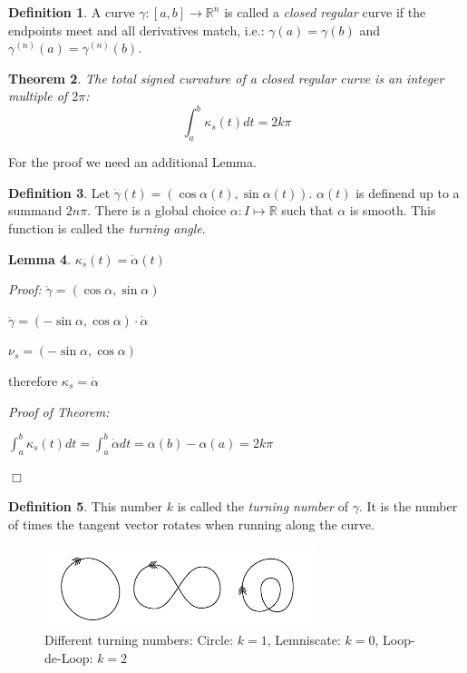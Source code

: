 \documentclass[a4paper,11pt,notitlepage,fullpage]{paper}
\newcommand{\dy}{\dot\gamma}
\newcommand{\ddy}{\ddot\gamma}
\theoremstyle{plain}
\newtheorem{thm}{Theorem}[section] %
\newtheorem{lem}[thm]{Lemma}
\theoremstyle{definition}
\newtheorem{defn}[thm]{Definition} %
\begin{document}
\begin{defn}
A curve $\gamma : [a,b] \to \mathbb R^n$ is called a \emph{closed regular} curve if the endpoints meet and all derivatives match, i.e.: $\gamma(a) = \gamma(b)$ and $\gamma^{(n)}(a) = \gamma^{(n)}(b)$.
\end{defn}

\begin{thm}
The total signed curvature of a closed regular curve is an integer multiple of $2\pi$:
\begin{equation*}
\int_a^b \kappa_s(t) dt = 2k\pi
\end{equation*}
\end{thm}

For the proof we need an additional Lemma.

\begin{defn}
Let $\dy(t) = (\cos\alpha(t), \sin\alpha(t))$. $\alpha(t)$ is definend up to a summand $2n\pi$. There is a global choice $\alpha: I \mapsto \mathbb R$ such that $\alpha$ is smooth. This function is called the \emph{turning angle}.
\end{defn}

\begin{lem}
$\kappa_s(t) = \dot\alpha(t)$
\end{lem}

\emph{Proof:} $\dy = (\cos \alpha, \sin \alpha)$

$\ddy = (-\sin\alpha, \cos\alpha) \cdot \dot\alpha$

$\nu_s = (-\sin \alpha, \cos \alpha)$

therefore $\kappa_s = \dot\alpha$

\emph{Proof of Theorem:}

$\int_a^b \kappa_s(t) dt = \int_a^b \dot\alpha dt = \alpha(b) - \alpha(a) = 2k\pi$

\hfill $\Box$

\begin{defn}
This number $k$ is called the \emph{turning number} of $\gamma$. It is the number of times the tangent vector rotates when running along the curve.
\end{defn}

\begin{figure}[H]
\centering
\includegraphics[width = 0.7\textwidth]{img/turning-number-examples}
\caption{Different turning numbers: Circle: $k=1$, Lemniscate: $k=0$, Loop-de-Loop: $k=2$}
\label{fig:turning-number-examples}
\end{figure}
\end{document}
